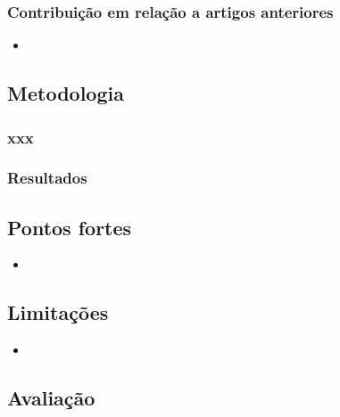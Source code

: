 \subsubsection{Contribuição em relação a artigos anteriores} %
 \begin{itemize}
   \item 
 \end{itemize}  

\subsection{Metodologia}

\subsubsection{xxx}

\subsubsection{Resultados}

\subsection{Pontos fortes} %
\begin{itemize}
  \item
\end{itemize}  

\subsection{Limitações} %
\begin{itemize}
  \item 
\end{itemize} 


\subsection{Avaliação}

